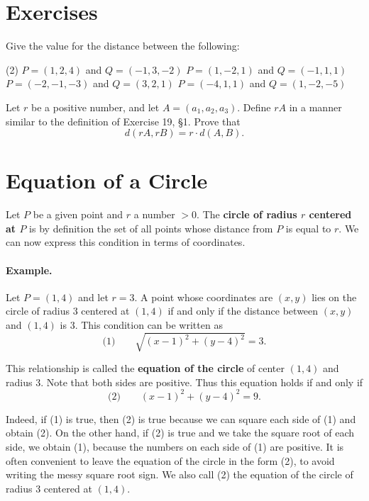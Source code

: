 \documentclass[12pt]{book} %
\begin{document}
\section*{Exercises}

\setcounter{Exercise}{0}
\begin{ExerciseList}
\Exercise Give the value for the distance between the following:
\begin{tasks}(2)
\task[(a)] $P=(1,2,4)$ and $Q=(-1,3,-2)$
\task[(b)] $P=(1,-2,1)$ and $Q=(-1,1,1)$
\task[(c)] $P=(-2,-1,-3)$ and $Q=(3,2,1)$
\task[(d)] $P=(-4,1,1)$ and $Q=(1,-2,-5)$
\end{tasks}

\Exercise Let $r$ be a positive number, and let $A=(a_1,a_2,a_3)$. Define $rA$ in a manner similar to the definition of Exercise 19, \S 1. Prove that
\[
d(rA,rB)=r\cdot d(A,B).
\]
\end{ExerciseList}

\section{Equation of a Circle}

Let $P$ be a given point and $r$ a number $>0$. The \textbf{circle of radius $r$ centered at $P$} is by definition the set of all points whose distance from $P$ is equal to $r$. We can now express this condition in terms of coordinates.

\paragraph{Example.}
Let $P=(1,4)$ and let $r=3$. A point whose coordinates are $(x,y)$ lies on the circle of radius 3 centered at $(1,4)$ if and only if the distance between $(x,y)$ and $(1,4)$ is 3. This condition can be written as
\[
\text{(1)}\qquad \sqrt{(x-1)^2+(y-4)^2}=3.
\]

This relationship is called the \textbf{equation of the circle} of center $(1,4)$ and radius 3. Note that both sides are positive. Thus this equation holds if and only if
\[
\text{(2)}\qquad (x-1)^2+(y-4)^2=9.
\]

Indeed, if (1) is true, then (2) is true because we can square each side of (1) and obtain (2). On the other hand, if (2) is true and we take the square root of each side, we obtain (1), because the numbers on each side of (1) are positive. It is often convenient to leave the equation of the circle in the form (2), to avoid writing the messy square root sign. We also call (2) the equation of the circle of radius 3 centered at $(1,4)$.
\end{document}
